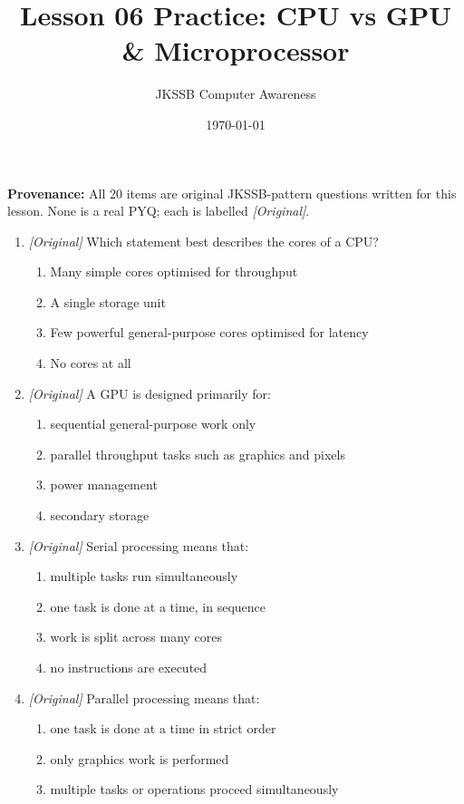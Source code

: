 \documentclass[11pt]{article}
\title{Lesson 06 Practice: CPU vs GPU \& Microprocessor}
\author{JKSSB Computer Awareness}
\date{\today}
\begin{document}
\maketitle
\noindent\textbf{Provenance:} All 20 items are original JKSSB-pattern
questions written for this lesson. None is a real PYQ; each is labelled
\textit{[Original]}.

\begin{enumerate}[label=\textbf{Q\arabic*.}, leftmargin=*]
\item \textit{[Original]} Which statement best describes the cores of a CPU?
  \begin{enumerate}[label=\Alph*.]
    \item Many simple cores optimised for throughput
    \item A single storage unit
    \item Few powerful general-purpose cores optimised for latency
    \item No cores at all
  \end{enumerate}
\item \textit{[Original]} A GPU is designed primarily for:
  \begin{enumerate}[label=\Alph*.]
    \item sequential general-purpose work only
    \item parallel throughput tasks such as graphics and pixels
    \item power management
    \item secondary storage
  \end{enumerate}
\item \textit{[Original]} Serial processing means that:
  \begin{enumerate}[label=\Alph*.]
    \item multiple tasks run simultaneously
    \item one task is done at a time, in sequence
    \item work is split across many cores
    \item no instructions are executed
  \end{enumerate}
\item \textit{[Original]} Parallel processing means that:
  \begin{enumerate}[label=\Alph*.]
    \item one task is done at a time in strict order
    \item only graphics work is performed
    \item multiple tasks or operations proceed simultaneously

\end{enumerate}
\end{enumerate}
\end{document}
